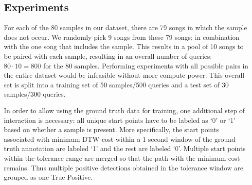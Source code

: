 \documentclass{article}
\begin{document}
\subsection{Experiments}
\label{exp}
For each of the 80 samples in our dataset, there are 79 songs in which the sample does not occur. We randomly pick 9 songs from these 79 songs; in combination with the one song that includes the sample. This results in a pool of 10 songs to be paired with each sample, resulting in an overall number of queries: $80\cdot10 = 800$ for the $80$ samples. Performing experiments with all possible pairs in the entire dataset would be infeasible without more compute power.
%
This overall set is split into a training set of 50 samples/500 queries and a test set of 30 samples/300 queries.

In order to allow using the ground truth data for training, one additional step of interaction is necessary: all unique start points have to be labeled as `0' or `1' based on whether a sample is present. %
More specifically, the start points associated with minimum DTW cost within a 1 second window of the ground truth annotation are labeled `1' and the rest are labeled `0'. Multiple start points within the tolerance range are merged so that the path with the minimum cost remains. Thus multiple positive detections obtained in the tolerance window are grouped as one True Positive. %
\end{document}
